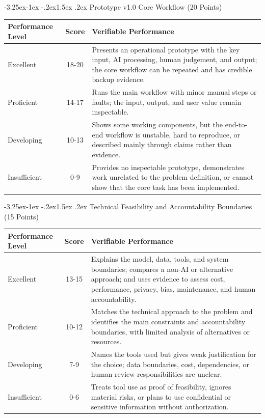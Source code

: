 \documentclass[11pt]{article}
\makeatletter
\renewcommand\subsection{\@startsection{subsection}{2}{\z@}%
    {-3.25ex\@plus -1ex \@minus -.2ex}{1.5ex \@plus .2ex}%
    {\normalfont\large\sffamily\bfseries}}
\newcommand{\formaltable}{%
  \small
  \setlength{\tabcolsep}{5pt}%
  \renewcommand{\arraystretch}{1.2}%
  \setlength{\arrayrulewidth}{0.4pt}%
}
\renewcommand{\arraystretch}{1.2}
\makeatother
\begin{document}
\subsection{Prototype v1.0 Core Workflow (20 Points)}
\begin{center}
\formaltable
\begin{tabularx}{\textwidth}{|l|c|Y|}
\hline
\textbf{Performance Level} & \textbf{Score} & \textbf{Verifiable Performance} \\ \hline
Excellent & 18-20 & Presents an operational prototype with the key input, AI processing, human judgement, and output; the core workflow can be repeated and has credible backup evidence. \\ \hline
Proficient & 14-17 & Runs the main workflow with minor manual steps or faults; the input, output, and user value remain inspectable. \\ \hline
Developing & 10-13 & Shows some working components, but the end-to-end workflow is unstable, hard to reproduce, or described mainly through claims rather than evidence. \\ \hline
Insufficient & 0-9 & Provides no inspectable prototype, demonstrates work unrelated to the problem definition, or cannot show that the core task has been implemented. \\ \hline
\end{tabularx}
\end{center}

\subsection{Technical Feasibility and Accountability Boundaries (15 Points)}
\begin{center}
\formaltable
\begin{tabularx}{\textwidth}{|l|c|Y|}
\hline
\textbf{Performance Level} & \textbf{Score} & \textbf{Verifiable Performance} \\ \hline
Excellent & 13-15 & Explains the model, data, tools, and system boundaries; compares a non-AI or alternative approach; and uses evidence to assess cost, performance, privacy, bias, maintenance, and human accountability. \\ \hline
Proficient & 10-12 & Matches the technical approach to the problem and identifies the main constraints and accountability boundaries, with limited analysis of alternatives or resources. \\ \hline
Developing & 7-9 & Names the tools used but gives weak justification for the choice; data boundaries, cost, dependencies, or human review responsibilities are unclear. \\ \hline
Insufficient & 0-6 & Treats tool use as proof of feasibility, ignores material risks, or plans to use confidential or sensitive information without authorization. \\ \hline
\end{tabularx}
\end{center}
\end{document}
